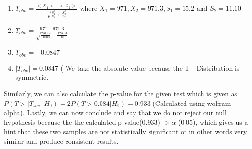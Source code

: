 \begin{enumerate}
    \item $T_{obv} = \frac{<X_1> - <X_2>}{\sqrt{\frac{S_1^2}{n_1} + \frac{S_2^2}{n_2}}}$ where $X_1 = 971, X_2 = 971.3, S_1 = 15.2 \text{ and } S_2 = 11.10$ 
    \item $T_{obv} = \frac{971 - 971.3}{\sqrt{\frac{231.04}{1000} + \frac{123.34}{10}}}$
    \item $T_{obv} = - 0.0847$
    \item $|T_{obv}| = 0.0847$ ( We take the absolute value because the T - Distribution is symmetric.
\end{enumerate}
Similarly, we can also calculate the p-value for the given test which is given as $P(T > |T_{obv}| | H_0) = 2P(T > 0.084 | H_0) = 0.933 $ (Calculated using wolfram alpha). Lastly, we can now conclude and say that we do not reject our null hypothesis because the the calculated p-value(0.933)  $> \alpha$ (0.05), which gives us a hint that these two samples are not statistically significant or in other words very similar and produce consistent results.
